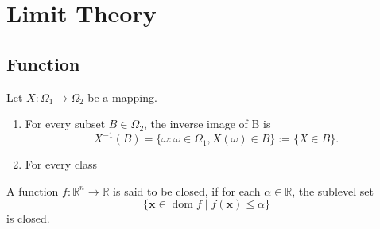 \chapter{Limit Theory}

\section{Function}

\begin{definition}[Mapping]
	Let $X:\Omega_1\rightarrow\Omega_2$ be a mapping.
	\begin{enumerate}
		\item
		      For every subset $B\in\Omega_2$, the inverse image of B is
		      \begin{equation*}
			      X^{-1}(B)=\{\omega:\omega\in\Omega_1,X(\omega)\in B\}:=\{X\in B\}.
		      \end{equation*}
		\item
		      For every class
	\end{enumerate}
\end{definition}

\begin{definition} \label{def:closed-function}
	A function $f:\mathbb{R}^{n}\rightarrow\mathbb{R}$ is said to be closed, if for each $\alpha\in\mathbb{R}$, the sublevel set
	\begin{equation}
		\{\mathbf{x}\in\operatorname{dom}f\mid f(\mathbf{x})\leq\alpha\}
	\end{equation}
	is closed.
\end{definition}

